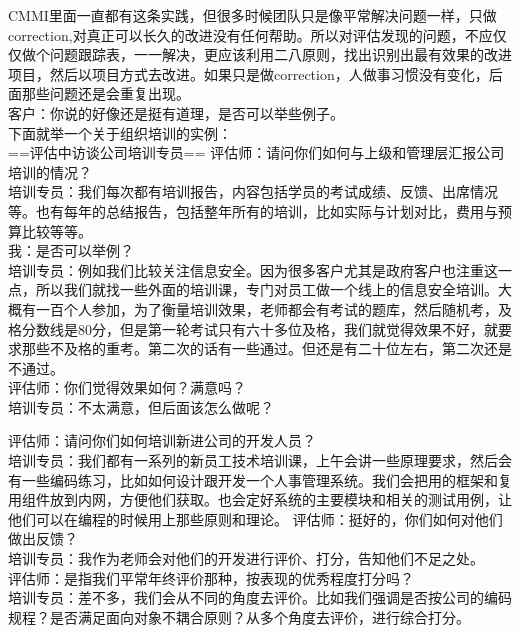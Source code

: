 CMMI里面一直都有这条实践，但很多时候团队只是像平常解决问题一样，只做correction,对真正可以长久的改进没有任何帮助。所以对评估发现的问题，不应仅仅做个问题跟踪表，一一解决，更应该利用二八原则，找出识别出最有效果的改进项目，然后以项目方式去改进。如果只是做correction，人做事习惯没有变化，后面那些问题还是会重复出现。\\
客户：你说的好像还是挺有道理，是否可以举些例子。\\
下面就举一个关于组织培训的实例：\\
==评估中访谈公司培训专员==
评估师：请问你们如何与上级和管理层汇报公司培训的情况？\\
培训专员：我们每次都有培训报告，内容包括学员的考试成绩、反馈、出席情况等。也有每年的总结报告，包括整年所有的培训，比如实际与计划对比，费用与预算比较等等。\\
我：是否可以举例？\\
培训专员：例如我们比较关注信息安全。因为很多客户尤其是政府客户也注重这一点，所以我们就找一些外面的培训课，专门对员工做一个线上的信息安全培训。大概有一百个人参加，为了衡量培训效果，老师都会有考试的题库，然后随机考，及格分数线是80分，但是第一轮考试只有六十多位及格，我们就觉得效果不好，就要求那些不及格的重考。第二次的话有一些通过。但还是有二十位左右，第二次还是不通过。\\
评估师：你们觉得效果如何？满意吗？\\
培训专员：不太满意，但后面该怎么做呢？

\begin{description}
\item[]
\end{description}

评估师：请问你们如何培训新进公司的开发人员？\\
培训专员：我们都有一系列的新员工技术培训课，上午会讲一些原理要求，然后会有一些编码练习，比如如何设计跟开发一个人事管理系统。我们会把用的框架和复用组件放到内网，方便他们获取。也会定好系统的主要模块和相关的测试用例，让他们可以在编程的时候用上那些原则和理论。
评估师：挺好的，你们如何对他们做出反馈？\\
培训专员：我作为老师会对他们的开发进行评价、打分，告知他们不足之处。\\
评估师：是指我们平常年终评价那种，按表现的优秀程度打分吗？\\
培训专员：差不多，我们会从不同的角度去评价。比如我们强调是否按公司的编码规程？是否满足面向对象不耦合原则？从多个角度去评价，进行综合打分。\\

